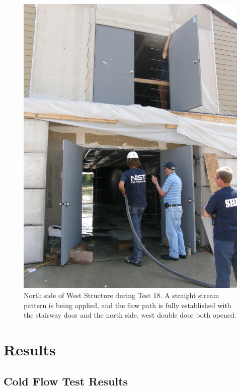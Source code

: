 \documentclass[12pt,oneside]{book}
\begin{document}
\begin{figure}[!ht]
\includegraphics[width=6in]{../../Figures/Test_18}
\caption[North Side of West Structure during Test 18]{North side of West Structure during Test 18. A straight stream pattern is being applied, and the flow path is fully established with the stairway door and the north side, west double door both opened.}
\label{fig:test_18_pic}
\end{figure}

\clearpage

\chapter{Results}
\label{chap:Results}

\section{Cold Flow Test Results}
\label{sec:Cold_Flow_Test_Results}
\end{document}
